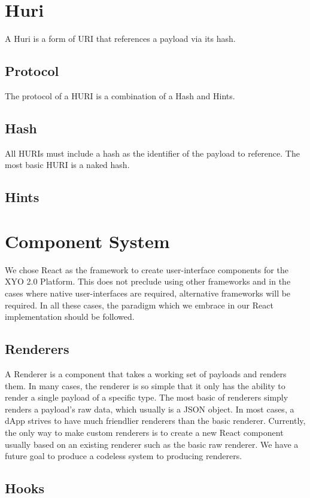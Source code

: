 \documentclass{article}
\begin{document}
\section{Huri}
A Huri is a form of URI that references a payload via its hash.
\subsection{Protocol}
The protocol of a HURI is a combination of a Hash and Hints.
\subsection{Hash}
All HURIs must include a hash as the identifier of the payload to reference. The most basic HURI is a naked hash.
\subsection{Hints}

\section{Component System}
We chose React as the framework to create user-interface components for the XYO 2.0 Platform.  This does not preclude using other frameworks and in the cases where native user-interfaces are required, alternative frameworks will be required.  In all these cases, the paradigm which we embrace in our React implementation should be followed.

\subsection{Renderers}
A Renderer is a component that takes a working set of payloads and renders them.  In many cases, the renderer is so simple that it only has the ability to render a single payload of a specific type.  The most basic of renderers simply renders a payload's raw data, which usually is a JSON object.  In most cases, a dApp strives to have much friendlier renderers than the basic renderer.  Currently, the only way to make custom renderers is to create a new React component usually based on an existing renderer such as the basic raw renderer.  We have a future goal to produce a codeless system to producing renderers.   

\subsection{Hooks}
\end{document}
